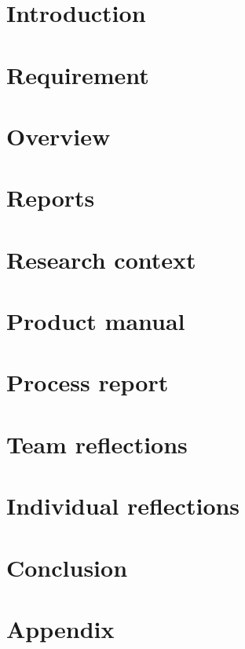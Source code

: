 \documentclass[a4paper,11pt]{report}
\begin{document}
\begin{abstract}
\end{abstract}

\newpage
\listoftodos   %

\newpage
\tableofcontents
\newpage

\chapter{Introduction}

\chapter{Requirement}


\chapter{Overview}


\chapter{Reports}


\chapter{Research context}


\chapter{Product manual}


\chapter{Process report}


\chapter{Team reflections}


\chapter{Individual reflections}


\chapter{Conclusion}


\appendix
\chapter{Appendix}


\end{document}
